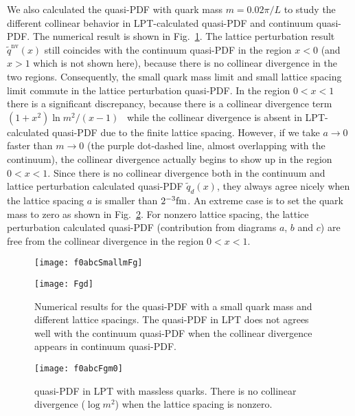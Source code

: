 \documentclass[english,preprint,aps,prd,showpacs,superscriptaddress,nofootinbib,tightenlines]{revtex4}
\begin{document}
We also calculated the quasi-PDF with quark mass $m=0.02\pi/L$ to
study the different collinear behavior in LPT-calculated quasi-PDF and
continuum quasi-PDF. The numerical result is shown in Fig.~\ref{fig:q_abdc_m0}.
The lattice perturbation result $\tilde{q}^{\mathrm{nv}}\left(x\right)$ still
coincides with the continuum quasi-PDF in the region $x<0$ (and $x>1$
which is not shown here), because there is no collinear divergence
in the two regions. Consequently, the small quark mass limit and
small lattice spacing limit commute in the lattice perturbation
quasi-PDF. In the region $0<x<1$ there is a significant discrepancy,
because there is a collinear divergence term $\left(1+x^{2}\right)\ln m^{2}/\left(x-1\right)$~\cite{Xiong:2013bka}
while the collinear divergence is absent in LPT-calculated quasi-PDF
due to the finite lattice spacing. However, if we take  $a\rightarrow0$
faster than $m\rightarrow0$ (the purple dot-dashed line, almost overlapping
with the continuum), the collinear divergence actually begins to show up
in the region $0<x<1$. Since there is no collinear divergence both
in the continuum and lattice perturbation calculated quasi-PDF $\tilde{q}_{d}\left(x\right)$,
they always  agree nicely when the lattice spacing $a$ is
smaller than $2^{-3}{\rm fm}$. An extreme case is to set the quark mass
to zero as shown in Fig.~\ref{fg:f_0m}. For nonzero lattice
spacing, the lattice perturbation calculated quasi-PDF (contribution from diagrams
$a$, $b$ and $c$) are free from the collinear divergence in the region $0<x<1$.
\begin{figure}
\begin{centering}
\texttt{[image: f0abcSmallmFg]}
\par\end{centering}
\begin{centering}
\texttt{[image: Fgd]}
\par\end{centering}
\centering{}\caption{Numerical results for the quasi-PDF with  a small quark mass and different lattice
spacings. The quasi-PDF in LPT does not agrees well with
the continuum quasi-PDF when the collinear divergence appears in continuum
quasi-PDF.}
\label{fig:q_abdc_m0}
\end{figure}

\begin{figure}
\begin{centering}
\texttt{[image: f0abcFgm0]}
\par\end{centering}
\caption{quasi-PDF in LPT with massless quarks. There is no collinear
divergence ($\log m^2$) when the lattice spacing is nonzero. 
}
\label{fg:f_0m}
\end{figure}
\end{document}
